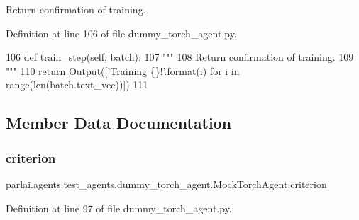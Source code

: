 \begin{DoxyVerb}Return confirmation of training.
\end{DoxyVerb}
 

Definition at line 106 of file dummy\+\_\+torch\+\_\+agent.\+py.


\begin{DoxyCode}
106     \textcolor{keyword}{def }train\_step(self, batch):
107         \textcolor{stringliteral}{"""}
108 \textcolor{stringliteral}{        Return confirmation of training.}
109 \textcolor{stringliteral}{        """}
110         \textcolor{keywordflow}{return} \hyperlink{namespaceparlai_1_1agents_1_1legacy__agents_1_1seq2seq_1_1torch__agent__v1_a2689006ea97d09413fb242f984bd8016}{Output}([\textcolor{stringliteral}{'Training \{\}!'}.\hyperlink{namespaceparlai_1_1chat__service_1_1services_1_1messenger_1_1shared__utils_a32e2e2022b824fbaf80c747160b52a76}{format}(i) \textcolor{keywordflow}{for} i \textcolor{keywordflow}{in} range(len(batch.text\_vec))])
111 
\end{DoxyCode}


\subsection{Member Data Documentation}
\mbox{\label{classparlai_1_1agents_1_1test__agents_1_1dummy__torch__agent_1_1MockTorchAgent_a229d18c3a8eb8512c29feca34fed43b7}} 
\subsubsection{\texorpdfstring{criterion}{criterion}}
{\footnotesize\ttfamily parlai.\+agents.\+test\+\_\+agents.\+dummy\+\_\+torch\+\_\+agent.\+Mock\+Torch\+Agent.\+criterion}



Definition at line 97 of file dummy\+\_\+torch\+\_\+agent.\+py.

\mbox{\label{classparlai_1_1agents_1_1test__agents_1_1dummy__torch__agent_1_1MockTorchAgent_afebdb752bdbb212a078b4bdee5d9f45f}} 
